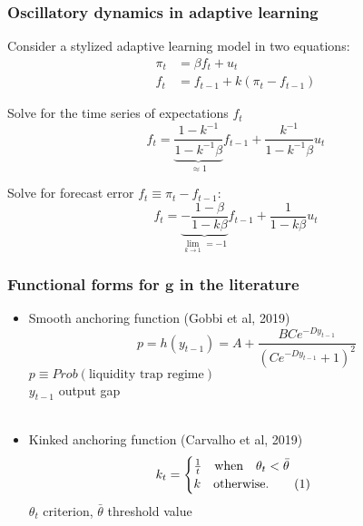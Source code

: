 \documentclass[10pt]{beamer}
\newcommand\numberthis{\addtocounter{equation}{1}\tag{\theequation}} %
\begin{document}
\begin{frame}[plain]  %
\frametitle{Oscillatory dynamics in adaptive learning}
	\label{oscillatory}

Consider a stylized adaptive learning model in two equations:
\begin{align}
\pi_t & = \beta f_t + u_t  \\
f_t & = f_{t-1} + k(\pi_t - f_{t-1}) 
\end{align}

Solve for the time series of expectations $f_t$
\begin{equation}
f_t = \underbrace{\frac{1-k^{-1}}{1-k^{-1}\beta}}_{\approx 1}f_{t-1} + \frac{k^{-1}}{1-k^{-1}\beta}u_t
\end{equation}

Solve for forecast error $f_t \equiv \pi_t - f_{t-1}$:
\begin{equation}
f_t = \underbrace{-\frac{1-\beta}{1-k\beta}}_{\lim_{k \to 1} = -1}f_{t-1} + \frac{1}{1-k\beta}u_t 
\end{equation}

\end{frame}


\begin{frame}[plain]  %
	\frametitle{Functional forms for $\mathbf{g}$ in the literature}
	\label{g}
\begin{itemize}
\item Smooth anchoring function (Gobbi et al, 2019)
\begin{equation}
 p = h(y_{t-1}) = A + \frac{B C e^{-D y_{t-1}}}{( C e^{-D y_{t-1}}+1)^2}
\end{equation}
$p \equiv Prob(\text{liquidity trap regime}) $ \\
$y_{t-1}$ output gap \\


\

\item Kinked anchoring function (Carvalho et al, 2019)
 \begin{align*}
k_t & = \begin{cases} \frac{1}{t} \quad \text{when} \quad \theta_t < \bar{\theta}  \\ k \quad \text{otherwise.}\numberthis
\end{cases} 
\end{align*}
$\theta_t$ criterion, $\bar{\theta}$ threshold value

\end{itemize}

\vfill 
\hyperlink{anchoring1}{}	

\end{frame}
\end{document}
